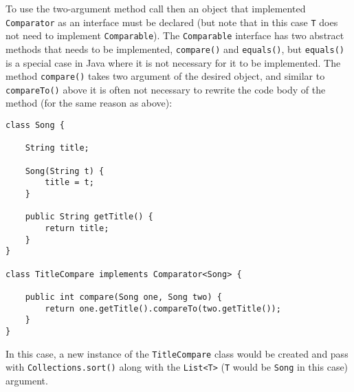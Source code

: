 \documentclass{tufte-handout}
\begin{document}
    To use the two-argument method call then an object that implemented \texttt{Comparator} as an interface must be declared (but note that in this case \texttt{T} does not need to implement \texttt{Comparable}). The \texttt{Comparable} interface has two abstract methods that needs to be implemented, \texttt{compare()} and \texttt{equals()}, but \texttt{equals()} is a special case in Java where it is not necessary for it to be implemented. The method \texttt{compare()} takes two argument of the desired object, and similar to \texttt{compareTo()} above it is often not necessary to rewrite the code body of the method (for the same reason as above):

    \begin{lstlisting}
class Song {
    
    String title;

    Song(String t) {
        title = t;
    }

    public String getTitle() {
        return title;
    }
}

class TitleCompare implements Comparator<Song> {
    
    public int compare(Song one, Song two) {
        return one.getTitle().compareTo(two.getTitle());
    }
}
    \end{lstlisting}

    In this case, a new instance of the \texttt{TitleCompare} class would be created and pass with \texttt{Collections.sort()} along with the \texttt{List<T>} (\texttt{T} would be \texttt{Song} in this case) argument.
\end{document}
